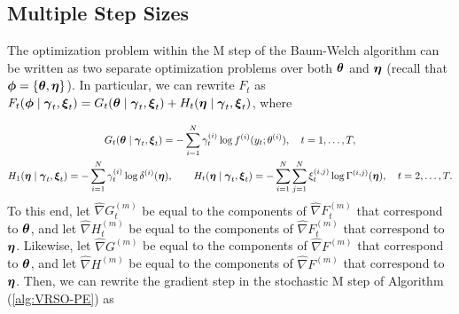 



\subsection{Multiple Step Sizes}

The optimization problem within the M step of the Baum-Welch algorithm can be written as two separate optimization problems over both $\boldsymbol{\theta}$ and $\boldsymbol{\eta}$ (recall that $\boldsymbol{\phi} = \{\boldsymbol{\theta},\boldsymbol{\eta}\}$). In particular, we can rewrite $F_t$ as $F_t(\boldsymbol{\phi} \mid \boldsymbol{\gamma}_t,  \boldsymbol{\xi}_t) = G_t(\boldsymbol{\theta} \mid  \boldsymbol{\gamma}_t,  \boldsymbol{\xi}_t) + H_t(\boldsymbol{\eta} \mid  \boldsymbol{\gamma}_t,  \boldsymbol{\xi}_t)$, where

\begin{gather}
    G_t(\boldsymbol{\theta} \mid  \boldsymbol{\gamma}_t,  \boldsymbol{\xi}_t) = - \sum_{i=1}^N  \gamma^{(i)}_t \log f^{(i)}(y_t;\theta^{(i)}), \quad t = 1,\ldots,T, \\
    H_1(\boldsymbol{\eta} \mid  \boldsymbol{\gamma}_t,  \boldsymbol{\xi}_t) = - \sum_{i=1}^N  \gamma^{(i)}_t \log \delta^{(i)}(\boldsymbol{\eta}), \qquad H_t(\boldsymbol{\eta} \mid  \boldsymbol{\gamma}_t,  \boldsymbol{\xi}_t) =  - \sum_{i=1}^N \sum_{j=1}^N  \xi^{(i,j)}_t \log \Gamma^{(i,j)}(\boldsymbol{\eta}), \quad t = 2,\ldots,T.
\end{gather}
%
To this end, let $\widehat \nabla G^{(m)}_{t}$ be equal to the components of $\widehat \nabla F^{(m)}_{t}$ that correspond to $\boldsymbol{\theta}$, and let $\widehat \nabla H^{(m)}_{t}$ be equal to the components of $\widehat \nabla F^{(m)}_{t}$ that correspond to $\boldsymbol{\eta}$. Likewise, let $\widehat \nabla G^{(m)}$ be equal to the components of $\widehat \nabla F^{(m)}$ that correspond to $\boldsymbol{\theta}$, and let $\widehat \nabla H^{(m)}$ be equal to the components of $\widehat \nabla F^{(m)}$ that correspond to $\boldsymbol{\eta}$. Then, we can rewrite the gradient step in the stochastic M step of Algorithm (\ref{alg:VRSO-PE}) as

